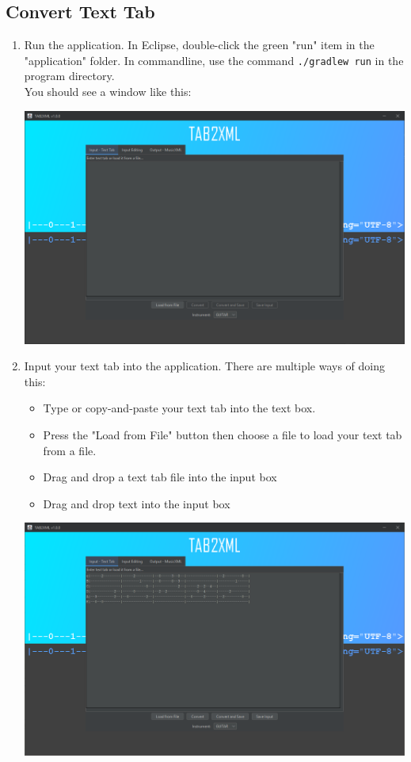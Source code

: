 \documentclass[11pt]{article}
\begin{document}
\subsection{Convert Text Tab}
\label{sec:org87bc7a9}
\begin{enumerate}
\item Run the application.  In Eclipse, double-click the green "run" item in the "application" folder.  In commandline, use the command \texttt{./gradlew run} in the program directory.\\
You should see a window like this:
\begin{center}
\includegraphics[width=.9\linewidth]{../Screenshots/main-interface-tabbedview-1.0.0.png}
\end{center}
\item Input your text tab into the application.  There are multiple ways of doing this:
\begin{itemize}
\item Type or copy-and-paste your text tab into the text box.
\item Press the "Load from File" button then choose a file to load your text tab from a file.
\item Drag and drop a text tab file into the input box
\item Drag and drop text into the input box
\end{itemize}
\begin{center}
\includegraphics[width=.9\linewidth]{../Screenshots/sample-inputs-tabbedview-1.0.0.png}

\end{center}
\end{enumerate}
\end{document}
